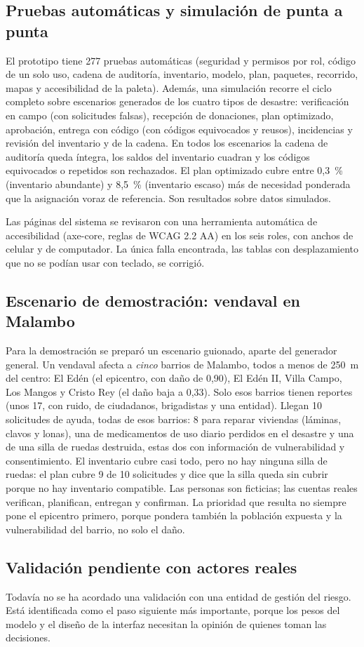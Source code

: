 \subsection{Pruebas automáticas y simulación de punta a punta}
El prototipo tiene 277 pruebas automáticas (seguridad y permisos por rol, código de un solo uso, cadena de auditoría, inventario, modelo, plan, paquetes, recorrido, mapas y accesibilidad de la paleta). Además, una simulación recorre el ciclo completo sobre escenarios generados de los cuatro tipos de desastre: verificación en campo (con solicitudes falsas), recepción de donaciones, plan optimizado, aprobación, entrega con código (con códigos equivocados y reusos), incidencias y revisión del inventario y de la cadena. En todos los escenarios la cadena de auditoría queda íntegra, los saldos del inventario cuadran y los códigos equivocados o repetidos son rechazados. El plan optimizado cubre entre 0,3~\% (inventario abundante) y 8,5~\% (inventario escaso) más de necesidad ponderada que la asignación voraz de referencia. Son resultados sobre datos simulados.

Las páginas del sistema se revisaron con una herramienta automática de accesibilidad (axe-core, reglas de WCAG 2.2 AA) en los seis roles, con anchos de celular y de computador. La única falla encontrada, las tablas con desplazamiento que no se podían usar con teclado, se corrigió.

\subsection{Escenario de demostración: vendaval en Malambo}
Para la demostración se preparó un escenario guionado, aparte del generador general. Un vendaval afecta a \emph{cinco} barrios de Malambo, todos a menos de 250~m del centro: El Edén (el epicentro, con daño de 0,90), El Edén II, Villa Campo, Los Mangos y Cristo Rey (el daño baja a 0,33). Solo esos barrios tienen reportes (unos 17, con ruido, de ciudadanos, brigadistas y una entidad). Llegan 10 solicitudes de ayuda, todas de esos barrios: 8 para reparar viviendas (láminas, clavos y lonas), una de medicamentos de uso diario perdidos en el desastre y una de una silla de ruedas destruida, estas dos con información de vulnerabilidad y consentimiento. El inventario cubre casi todo, pero no hay ninguna silla de ruedas: el plan cubre 9 de 10 solicitudes y dice que la silla queda sin cubrir porque no hay inventario compatible. Las personas son ficticias; las cuentas reales verifican, planifican, entregan y confirman. La prioridad que resulta no siempre pone el epicentro primero, porque pondera también la población expuesta y la vulnerabilidad del barrio, no solo el daño.

\subsection{Validación pendiente con actores reales}
Todavía no se ha acordado una validación con una entidad de gestión del riesgo. Está identificada como el paso siguiente más importante, porque los pesos del modelo y el diseño de la interfaz necesitan la opinión de quienes toman las decisiones.
